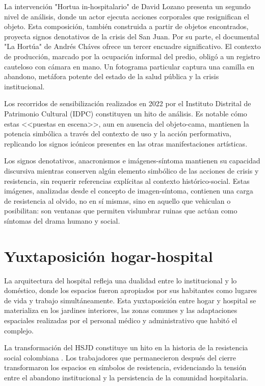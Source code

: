 La intervención "Hortua in-hospitalario" de David Lozano presenta un segundo nivel de análisis, donde un actor ejecuta acciones corporales que resignifican el objeto. Esta composición, también construida a partir de objetos encontrados, proyecta signos denotativos de la crisis del San Juan. Por su parte, el documental "La Hortúa" de Andrés Cháves ofrece un tercer encuadre significativo. El contexto de producción, marcado por la ocupación informal del predio, obligó a un registro cauteloso con cámara en mano. Un fotograma particular captura una camilla en abandono, metáfora potente del estado de la salud pública y la crisis institucional.

Los recorridos de sensibilización realizados en 2022 por el Instituto Distrital de Patrimonio Cultural (IDPC) constituyen un hito de análisis. Es notable cómo estas <<puestas en escena>>, aun en ausencia del objeto-cama, mantienen la potencia simbólica a través del contexto de uso y la acción performativa, replicando los signos icónicos presentes en las otras manifestaciones artísticas.

Los signos denotativos, anacronismos e imágenes-síntoma mantienen su capacidad discursiva mientras conserven algún elemento simbólico de las acciones de crisis y resistencia, sin requerir referencias explícitas al contexto histórico-social. Estas imágenes, analizadas desde el concepto de imagen-síntoma, contienen una carga de resistencia al olvido, no en sí mismas, sino en aquello que vehiculan o posibilitan: son ventanas que permiten vislumbrar ruinas que actúan como síntomas del drama humano y social.

\section{Yuxtaposición hogar-hospital}

La arquitectura del hospital refleja una dualidad entre lo institucional y lo doméstico, donde los espacios fueron apropiados por sus habitantes como lugares de vida y trabajo simultáneamente. Esta yuxtaposición entre hogar y hospital se materializa en los jardines interiores, las zonas comunes y las adaptaciones espaciales realizadas por el personal médico y administrativo que habitó el complejo.

La transformación del HSJD constituye un hito en la historia de la resistencia social colombiana \parencite{Gongora2013}. Los trabajadores que permanecieron después del cierre transformaron los espacios en símbolos de resistencia, evidenciando la tensión entre el abandono institucional y la persistencia de la comunidad hospitalaria.

